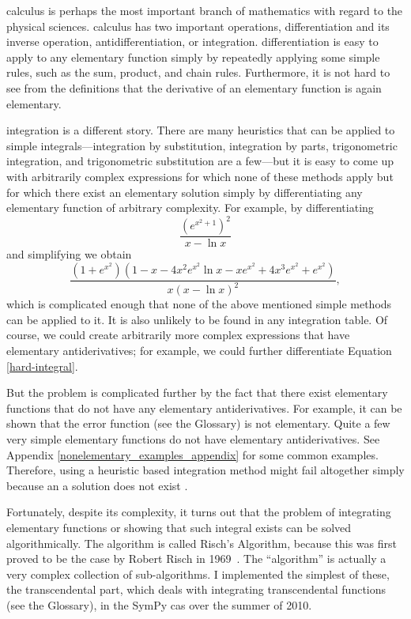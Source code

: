 \Gls{calculus} is perhaps the most important branch of mathematics with
regard to the physical sciences.  \Gls{calculus} has two important
operations, \gls{differentiation} and its inverse operation,
antidifferentiation, or \gls{integration}.  \Gls{differentiation} is
easy to apply to any \gls{elementary} function simply by repeatedly
applying some simple rules, such as the sum, product, and chain rules.
Furthermore, it is not hard to see from the definitions that the
derivative of an \gls{elementary} function is again \gls{elementary}.

\Gls{integration} is a different story.  There are many heuristics that
can be applied to simple integrals---\gls{integration} by substitution,
\gls{integration} by parts, trigonometric \gls{integration}, and
trigonometric substitution are a few---but it is easy to come up with
arbitrarily complex expressions for which none of these methods apply
but for which there exist an \gls{elementary} solution simply by
differentiating any \gls{elementary} function of arbitrary complexity.  For
example, by differentiating
\begin{equation}
\label{hard-integral-sol}
    \frac{\left(e^{x^{2} + 1}\right)^{2}}{x - \ln{x}}
\end{equation}
and simplifying we obtain
\begin{equation}
\label{hard-integral}
    \frac{\left(1 + e^{x^{2}}\right) \left(1 - x - 4 x^{2} e^{x^{2}}
    \ln{x} - x e^{x^{2}} + 4 x^{3} e^{x^{2}} +
    e^{x^{2}}\right)}{x \left(x -
    \ln{x}\right)^{2}},
\end{equation}
which is complicated enough that none of the above mentioned simple
methods can be applied to it.  It is also unlikely to be found in any
integration table.  Of course, we could create arbitrarily more complex
expressions that have \gls{elementary} antiderivatives; for example, we
could further differentiate Equation \ref{hard-integral}. 

But the problem is complicated further by the fact that there exist
\gls{elementary} functions that do not have any \gls{elementary}
antiderivatives.  For example, it can be shown that the \gls{error
function} (see the Glossary) is not \gls{elementary}.  Quite a few very simple
\gls{elementary} functions do not have \gls{elementary} antiderivatives.  See
Appendix \ref{nonelementary_examples_appendix} for some common examples.
Therefore, using a heuristic based \gls{integration} method might fail
altogether simply because an a solution does not exist .

Fortunately, despite its complexity, it turns out that the problem of
integrating \gls{elementary} functions or showing that such integral exists
can be solved algorithmically.  The algorithm is called Risch's
Algorithm, because this was first proved to be the case by Robert Risch
in 1969~\cite{risch1969problem}.  The ``algorithm'' is actually a very
complex collection of sub-algorithms.  I implemented the simplest of
these, the \gls{transcendental} part, which deals with integrating
\gls{transcendental} functions (see the Glossary), in the SymPy
\gls{cas} over the summer of 2010.
